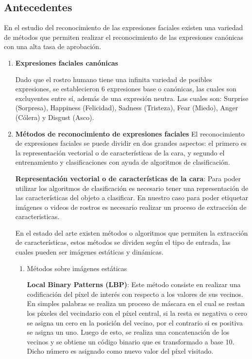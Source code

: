 \documentclass{article}
\begin{document}
    \subsection{Antecedentes}
En el estudio del reconocimiento de las expresiones faciales existen una variedad de métodos que permiten realizar el reconocimiento de las expresiones canónicas con una alta tasa de aprobación.
        \begin{enumerate}
        \item \textbf{Expresiones faciales canónicas}
        
                Dado que el rostro humano tiene una infinita variedad de posibles expresiones, se establecieron 6 expresiones base o canónicas, las cuales son excluyentes entre sí, además de una expresión neutra. Las cuales son:  Surprise (Sorpresa), Happiness (Felicidad), Sadness (Tristeza), Fear (Miedo), Anger (Cólera) y Disgust (Asco).
        \item \textbf{Métodos de reconocimiento de expresiones faciales} 
        El reconocimiento de expresiones faciales se puede dividir en dos grandes aspectos: el primero es la representación vectorial o de características de la cara, y segundo el entrenamiento y clasificaciones con ayuda de algoritmos de clasificación.
        
        \textbf{Representación vectorial o de características de la cara}:
        Para poder utilizar los algoritmos de clasificación es necesario tener una representación de las características del objeto a clasificar. En nuestro caso para poder etiquetar imágenes o videos de rostros es necesario realizar un proceso de extracción de caracteristicas. 

En el estado del arte existen métodos o algoritmos que permiten la extracción de características, estos métodos se dividen según el tipo de entrada, las cuales pueden ser imágenes estáticas y dinámicas.  
            \begin{enumerate}
                \item Métodos sobre imágenes estáticas
                
                     \textbf{Local Binary Patterns (LBP)}:
                    Este método consiste en realizar una codificación del píxel de interés con respecto a los valores de sus vecinos. En simples palabras se realiza un proceso de máscara en el cual se restan los píxeles del vecindario con el píxel central, si la resta es negativa o cero se asigna un cero en la posición del vecino, por el contrario si es positiva se asigna un uno. Luego de esto, se realiza una concatenación de los vecinos y se obtiene un código binario que es transformado a base 10. Dicho número es asignado como nuevo valor del píxel visitado.


\end{enumerate}
\end{enumerate}
\end{document}
